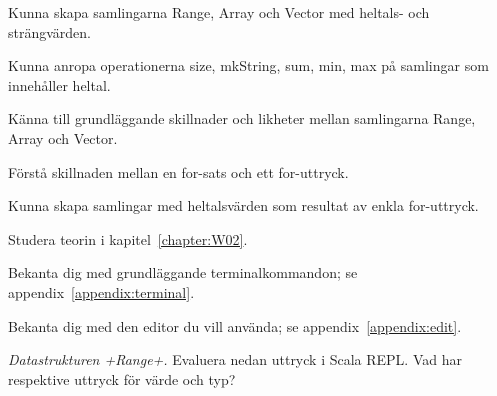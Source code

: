 
\Exercise{\ExeWeekTWO}

\begin{Goals}
\item Kunna skapa samlingarna Range, Array och Vector med heltals- och strängvärden.
\item Kunna anropa operationerna size, mkString, sum, min, max på samlingar som innehåller heltal.
\item Känna till grundläggande skillnader och likheter mellan samlingarna Range, Array och Vector.
\item Förstå skillnaden mellan en for-sats och ett for-uttryck.
\item Kunna skapa samlingar med heltalsvärden som resultat av enkla for-uttryck.
\end{Goals}

\begin{Preparations}
\item Studera teorin i kapitel~\ref{chapter:W02}.
\item Bekanta dig med grundläggande terminalkommandon; se appendix~\ref{appendix:terminal}. 
\item Bekanta dig med den editor du vill använda; se appendix~\ref{appendix:edit}.
\end{Preparations}

\BasicTasks %

\Task  \emph{Datastrukturen \code+Range+.} Evaluera nedan uttryck i Scala REPL. Vad har respektive uttryck för värde och typ?

\Subtask {}

\Subtask {}

\Subtask {}

\Subtask {}

\Subtask {}

\Subtask {}

\Subtask {}

\Subtask {}

\Subtask {}

\Subtask {}

\Subtask {}

\Subtask {}

\Subtask {}

